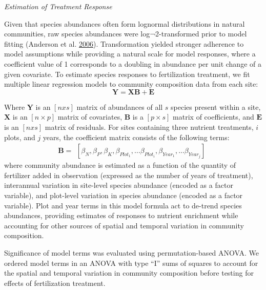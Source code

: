 \documentclass[twoside,12pt,final]{ucthesis-CA2012}
\begin{document}
\begin{ucmainmatter}
\emph{Estimation of Treatment Response}

Given that species abundances often form lognormal distributions in natural communities, raw species abundances were log¬2-transformed prior to model fitting (Anderson et al. \protect\hyperlink{ref-Anderson2006}{2006}). Transformation yielded stronger adherence to model assumptions while providing a natural scale for model responses, where a coefficient value of 1 corresponds to a doubling in abundance per unit change of a given covariate.
To estimate species responses to fertilization treatment, we fit multiple linear regression models to community composition data from each site:
\[\mathbf{Y} = \mathbf{XB} + \mathbf{E}\]

Where \(\mathbf{Y}\) is an \([n x s]\) matrix of abundances of all \(s\) species present within a site, \(\mathbf{X}\) is an \([n \times p]\) matrix of covariates, \(\mathbf{B}\) is a \([p \times s]\) matrix of coefficients, and \(\mathbf{E}\) is an \([n x s]\) matrix of residuals. For sites containing three nutrient treatments, \(i\) plots, and \(j\) years, the coefficient matrix consists of the following terms:
\[\mathbf{B} = \begin{matrix}
    [{\beta}_N, {\beta}_P , {\beta}_K, {\beta}_{Plot_1}, ... {\beta}_{Plot_i},
    {\beta}_{Year_1}, ... {\beta}_{Year_j}]
\end{matrix} \]
where community abundance is estimated as a function of the quantity of fertilizer added in observation (expressed as the number of years of treatment), interannual variation in site-level species abundance (encoded as a factor variable), and plot-level variation in species abundance (encoded as a factor variable). Plot and year terms in this model formula act to de-trend species abundances, providing estimates of responses to nutrient enrichment while accounting for other sources of spatial and temporal variation in community composition.

Significance of model terms was evaluated using permutation-based ANOVA. We ordered model terms in an ANOVA with type ``I'' sums of squares to account for the spatial and temporal variation in community composition before testing for effects of fertilization treatment.


\end{ucmainmatter}
\end{document}
